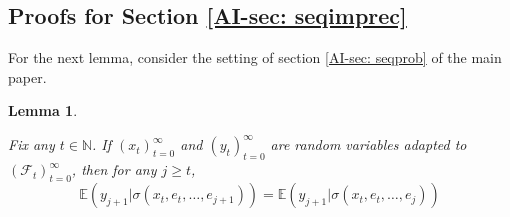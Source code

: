 \documentclass[12pt]{ectaart}
\newcommand{\1}{\mathbbm 1}
\theoremstyle{plain}
\newtheorem{lemma}{Lemma}[section]
\theoremstyle{definition}
\begin{document}
	\subsection*{Proofs for Section \ref{AI-sec: seqimprec}}
	
	For the next lemma, consider the setting of section \ref{AI-sec: seqprob} of the main paper.
	
	\begin{lemma}\label{eq: futureshock}
		
		
		Fix any $t\in\mathbb{N}$. If $(x_{t})_{t=0}^{\infty}$ and $(y_{t})_{t=0}^{\infty}$ are random variables adapted to $(\mathscr{F}_{t})_{t=0}^{\infty}$, then for any $j\geq t$, \[\mathbb{E}(y_{j+1}\vert \sigma(x_{t},e_{t},\dots,e_{j+1})) =\mathbb{E}(y_{j+1}\vert \sigma(x_{t},e_{t},\dots,e_{j}))\]
	\end{lemma}
	
\end{document}
